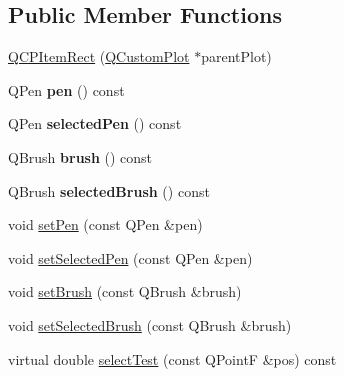 \subsection*{Public Member Functions}
\begin{DoxyCompactItemize}
\item 
\hyperlink{classQCPItemRect_a412ad1579f7a1fba453d0fa28c496cbc}{Q\-C\-P\-Item\-Rect} (\hyperlink{classQCustomPlot}{Q\-Custom\-Plot} $\ast$parent\-Plot)
\item 
\hypertarget{classQCPItemRect_a3cb7b6de5e82cc5a3c99e9de919a55e6}{Q\-Pen {\bfseries pen} () const }\label{classQCPItemRect_a3cb7b6de5e82cc5a3c99e9de919a55e6}

\item 
\hypertarget{classQCPItemRect_a7e701c34e72a4c25647e93fa369f395c}{Q\-Pen {\bfseries selected\-Pen} () const }\label{classQCPItemRect_a7e701c34e72a4c25647e93fa369f395c}

\item 
\hypertarget{classQCPItemRect_a03d2d26ffcac78b25b8e90915f9c4abe}{Q\-Brush {\bfseries brush} () const }\label{classQCPItemRect_a03d2d26ffcac78b25b8e90915f9c4abe}

\item 
\hypertarget{classQCPItemRect_a3b586228393f5c8efa78c4d2a4b25cbf}{Q\-Brush {\bfseries selected\-Brush} () const }\label{classQCPItemRect_a3b586228393f5c8efa78c4d2a4b25cbf}

\item 
void \hyperlink{classQCPItemRect_a483c0da5a17e1646cd17ddea2c124e7d}{set\-Pen} (const Q\-Pen \&pen)
\item 
void \hyperlink{classQCPItemRect_a52a1bcb2dc753a538e406a2ba3cf21ce}{set\-Selected\-Pen} (const Q\-Pen \&pen)
\item 
void \hyperlink{classQCPItemRect_abbd4e346a03513ee466afc25d9c75446}{set\-Brush} (const Q\-Brush \&brush)
\item 
void \hyperlink{classQCPItemRect_abd1792859844118dedee86223cede7af}{set\-Selected\-Brush} (const Q\-Brush \&brush)
\item 
virtual double \hyperlink{classQCPItemRect_a0406a7da87557006f63b5d98ee6c397b}{select\-Test} (const Q\-Point\-F \&pos) const 
\end{DoxyCompactItemize}
